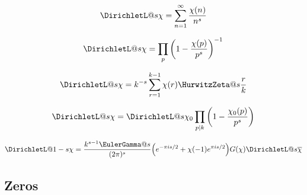 \documentclass{article}
\begin{document}
\begin{equation}\label{eq:ZE.DIR.DIR1}%
  \DirichletL@{s}{\chi} = \sum_{n=1}^\infty \frac{\chi(n)}{n^s}
\end{equation}


\begin{equation}\label{eq:ZE.DIR.DIR2}%
  \DirichletL@{s}{\chi} = \prod_p \left( 1 - \frac{\chi(p)}{p^s} \right)^{-1}
\end{equation}

\begin{equation}\label{eq:ZE.DIR.DIR3}%
  \DirichletL@{s}{\chi}
  = k^{-s} \sum_{r=1}^{k-1} \chi(r) \HurwitzZeta@{s}{\frac{r}{k}}
\end{equation}

 
\begin{equation}\label{eq:ZE.DIR.DIR4}%
  \DirichletL@{s}{\chi}
  = \DirichletL@{s}{\chi_0}
    \prod_{p \divides k} \left( 1 - \frac{\chi_0(p)}{p^s} \right)
\end{equation}


\begin{equation}\label{eq:ZE.DIR.DIR5}%
  \DirichletL@{1-s}{\chi}
  = \frac{k^{s-1} \EulerGamma@{s}}{(2 \cpi)^s}
    \* {\left( \expe^{-\cpi \iunit s/2} + \chi(-1) \expe^{\cpi \iunit s/2} \right)}
    \* G(\chi) \DirichletL@{s}{\overline{\chi}}
\end{equation}

\subsection{Zeros}\label{sec:ZE.DIR.ZERO}%
\end{document}
